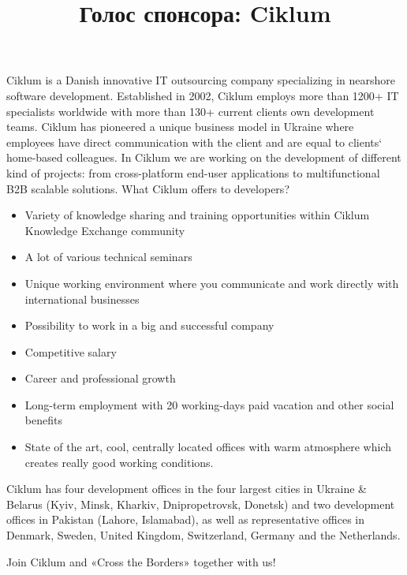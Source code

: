 \documentclass[10pt, a5paper]{article}
\begin{document}
\title{Голос спонсора: Ciklum}
\date{}
\maketitle
\begin{figure}[ht]
\end{figure}
Ciklum is a Danish innovative IT outsourcing company specializing in nearshore software development. 
Established in 2002, Ciklum employs more than 1200+ IT specialists worldwide with more than 130+ current clients own development teams. Ciklum has pioneered a unique business model in Ukraine where employees have direct communication with the client and are equal to clients` home-based colleagues. In Ciklum we are working on the development of different kind of projects: from cross-platform end-user applications to multifunctional B2B scalable solutions. What Ciklum offers to developers?
\begin{itemize}
\item Variety of knowledge sharing and training opportunities within Ciklum Knowledge Exchange community
\item A lot of various technical seminars
\item Unique working environment where you communicate and work directly with international businesses
\item Possibility to work in a big and successful company
\item Competitive salary
\item Career and professional growth 
\item Long-term employment with 20 working-days paid vacation and other social benefits 
\item State of the art, cool, centrally located offices with warm \linebreak atmosphere which creates really good working conditions.
\end{itemize}
Ciklum has four development offices in the four largest cities in Ukraine \& Belarus (Kyiv, Minsk, Kharkiv, Dnipropetrovsk, Donetsk) and two development offices in Pakistan (Lahore, Islamabad), as well as \linebreak representative offices in Denmark, Sweden, United Kingdom, Switzerland, Germany and the Netherlands. 

Join Ciklum and «Cross the Borders» together with us!

\begin{figure}[ht]
\end{figure}
\end{document}
